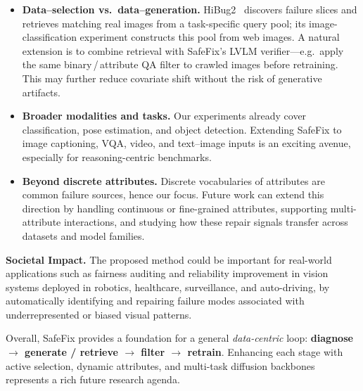 \documentclass[10pt]{article} %
\newcommand{\model}{SafeFix\xspace}
\begin{document}
\begin{itemize}
  \item \textbf{Data–selection vs.\ data–generation.}  
        HiBug2~\citep{chen2025hibug2} discovers failure slices and retrieves matching real images from a task-specific query pool; its image-classification experiment constructs this pool from web images. A natural extension is to combine retrieval with SafeFix's LVLM verifier---e.g.\ apply the
        same binary\,/\,attribute QA filter to crawled images before
        retraining. This may further reduce covariate shift without the
        risk of generative artifacts.




  \item \textbf{Broader modalities and tasks.}  
        Our experiments already cover classification, pose estimation, and
        object detection. Extending \model{} to image captioning, VQA, video,
        and text--image inputs is an exciting avenue, especially for
        reasoning-centric benchmarks.
        
    \item \textbf{Beyond discrete attributes.} Discrete vocabularies of attributes are common failure sources, hence our focus. Future work can extend this direction by handling continuous or fine-grained attributes, supporting multi-attribute interactions, and studying how these repair signals transfer across datasets and model families.
\end{itemize}

\textbf{Societal Impact.} The proposed method could be important for real-world applications such as fairness auditing and reliability improvement in vision systems deployed in robotics, healthcare, surveillance, and auto-driving, by automatically identifying and repairing failure modes associated with underrepresented or biased visual patterns.

Overall, \model{} provides a foundation for a general \emph{data-centric}
loop: \textbf{diagnose $\rightarrow$ generate / retrieve $\rightarrow$
filter $\rightarrow$ retrain}. Enhancing each stage with active
selection, dynamic attributes, and multi-task diffusion backbones
represents a rich future research agenda.
\end{document}
